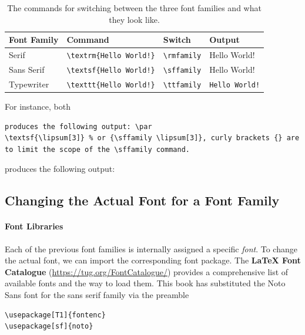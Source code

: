 \begin{table}[ht!]
\begin{tabularx}{\textwidth}{|l|X|l|l|}
\hline
Font Family & Command & Switch & Output \\
\hline
Serif & \texttt{\textbackslash textrm\{Hello World!\}}& \texttt{\textbackslash rmfamily} & \textrm{Hello World!} \\
\hline
Sans Serif & \texttt{\textbackslash textsf\{Hello World!\}}& \texttt{\textbackslash sffamily} & \textsf{Hello World!} \\
\hline
Typewriter & \texttt{\textbackslash texttt\{Hello World!\}}& \texttt{\textbackslash ttfamily} & \texttt{Hello World!} \\
\hline
\end{tabularx}
\caption{The commands for switching between the three font families and what they look like.}
\label{tab:fontfamily}
\end{table}%
%
For instance, both
\begin{lstlisting}
produces the following output: \par
\textsf{\lipsum[3]} % or {\sffamily \lipsum[3]}, curly brackets {} are to limit the scope of the \sffamily command.
\end{lstlisting}
produces the following output: \par
{\sffamily \lipsum[3]}

\subsection{Changing the Actual Font for a Font Family}

\paragraph{Font Libraries}
Each of the previous font families is internally assigned a specific \textit{font}. To change the actual font, we can import the corresponding font package. The \textbf{\LaTeX{} Font Catalogue} (\href{https://tug.org/FontCatalogue/}{https://tug.org/FontCatalogue/}) provides a comprehensive list of available fonts and the way to load them. This book has substituted the Noto Sans font for the sans serif family via the preamble
\begin{lstlisting}
\usepackage[T1]{fontenc}
\usepackage[sf]{noto}
\end{lstlisting}

